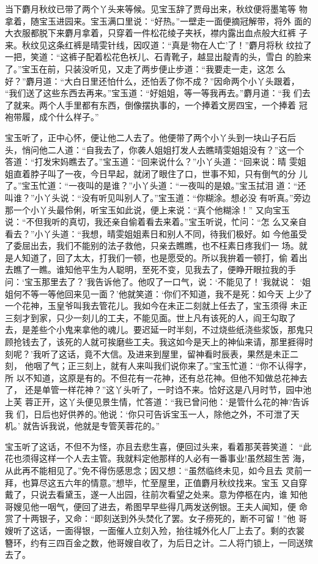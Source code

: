 当下麝月秋纹已带了两个丫头来等候。见宝玉辞了贾母出来，秋纹便将墨笔等
物拿着，随宝玉进园来。宝玉满口里说：“好热。”一壁走一面便摘冠解带，将外
面的大衣服都脱下来麝月拿着，只穿着一件松花绫子夹袄，襟内露出血点般大红裤
子来。秋纹见这条红裤是晴雯针线，因叹道：“真是‘物在人亡’了！”麝月将秋
纹拉了一把，笑道：“这裤子配着松花色袄儿、石青靴子，越显出靛青的头，雪白
的脸来了。”宝玉在前，只装没听见，又走了两步便止步道：“我要走一走，这怎
么好？”麝月道：“大白日里还怕什么，还怕丢了你不成？”因命两个小丫头跟着，
“我们送了这些东西去再来。”宝玉道：“好姐姐，等一等我再去。”麝月道：“我
们去了就来。两个人手里都有东西，倒像摆执事的，一个捧着文房四宝，一个捧着
冠袍带履，成个什么样子。”

宝玉听了，正中心怀，便让他二人去了。他便带了两个小丫头到一块山子石后
头，悄问他二人道：“自我去了，你袭人姐姐打发人去瞧晴雯姐姐没有？”这一个
答道：“打发宋妈瞧去了。”宝玉道：“回来说什么？”小丫头道：“回来说：晴
雯姐姐直着脖子叫了一夜，今日早起，就闭了眼住了口，世事不知，只有倒气的分
儿了。”宝玉忙道：“一夜叫的是谁？”小丫头道：“一夜叫的是娘。”宝玉拭泪
道：“还叫谁？”小丫头说：“没有听见叫别人了。”宝玉道：“你糊涂。想必没
有听真。”旁边那一个小丫头最伶俐，听宝玉如此说，便上来说：“真个他糊涂！”
又向宝玉说：“不但我听的真切，我还亲自偷着看去来着。”宝玉听说，忙问：“怎
么又亲自看去？”小丫头道：“我想，晴雯姐姐素日和别人不同，待我们极好。如
今他虽受了委屈出去，我们不能别的法子救他，只亲去瞧瞧，也不枉素日疼我们一
场。就是人知道了，回了太太，打我们一顿，也是愿受的。所以我拚着一顿打，偷
着出去瞧了一瞧。谁知他平生为人聪明，至死不变，见我去了，便睁开眼拉我的手
问：‘宝玉那里去了？’我告诉他了。他叹了一口气，说：‘不能见了！’我就说：
‘姐姐何不等一等他回来见一面？’他就笑道：‘你们不知道，我不是死：如今天
上少了一个花神，玉皇爷叫我去管花儿。我如今在未正二刻就上任去了，宝玉须得
未正三刻才到家，只少一刻儿的工夫，不能见面。世上凡有该死的人，阎王勾取了
去，是差些个小鬼来拿他的魂儿。要迟延一时半刻，不过烧些纸浇些浆饭，那鬼只
顾抢钱去了，该死的人就可挨磨些工夫。我这如今是天上的神仙来请，那里捱得时
刻呢？’我听了这话，竟不大信。及进来到屋里，留神看时辰表，果然是未正二刻，
他咽了气；正三刻上，就有人来叫我们说你来了。”宝玉忙道：“你不认得字，所
以不知道，这原是有的。不但花有一花神，还有总花神。但他不知做总花神去了，
还是单管一样花神？”这丫头听了，一时诌不来。恰好这是八月时节，园中池上芙
蓉正开，这丫头便见景生情，忙答道：“我已曾问他：‘是管什么花的神?告诉我
们，日后也好供养的。’他说：‘你只可告诉宝玉一人，除他之外，不可泄了天机。’
就告诉我说，他就是专管芙蓉花的。”

宝玉听了这话，不但不为怪，亦且去悲生喜，便回过头来，看着那芙蓉笑道：
“此花也须得这样一个人去主管。我就料定他那样的人必有一番事业!虽然超生苦
海，从此再不能相见了。”免不得伤感思念；因又想：“虽然临终未见，如今且去
灵前一拜，也算尽这五六年的情意。”想毕，忙至屋里，正值麝月秋纹找来。宝玉
又自穿戴了，只说去看黛玉，遂一人出园，往前次看望之处来。意为停柩在内，谁
知他哥嫂见他一咽气，便回了进去，希图早早些得几两发送例银。王夫人闻知，便
命赏了十两银子，又命：“即刻送到外头焚化了罢。女子痨死的，断不可留！”他
哥嫂听了这话，一面得银，一面催人立刻入殓，抬往城外化人厂上去了。剩的衣裳
簪环，约有三四百金之数，他哥嫂自收了，为后日之计。二人将门锁上，一同送殡
去了。

